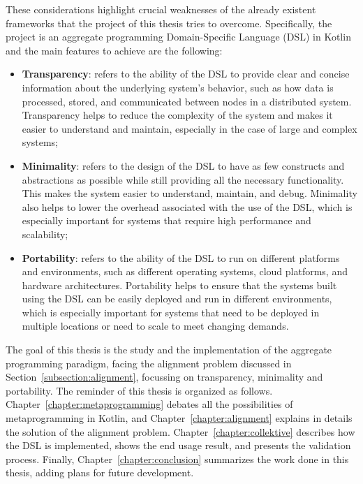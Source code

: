 These considerations highlight crucial weaknesses of the already existent frameworks that the project of this thesis tries to overcome. Specifically, the project is an aggregate programming Domain-Specific Language (DSL) in Kotlin and the main features to achieve are the following:
\begin{itemize}
    \item \textbf{Transparency}: refers to the ability of the DSL to provide clear and concise information about the underlying system's behavior, such as how data is processed, stored, and communicated between nodes in a distributed system. Transparency helps to reduce the complexity of the system and makes it easier to understand and maintain, especially in the case of large and complex systems;
    \item \textbf{Minimality}: refers to the design of the DSL to have as few constructs and abstractions as possible while still providing all the necessary functionality. This makes the system easier to understand, maintain, and debug. Minimality also helps to lower the overhead associated with the use of the DSL, which is especially important for systems that require high performance and scalability;
    \item \textbf{Portability}: refers to the ability of the DSL to run on different platforms and environments, such as different operating systems, cloud platforms, and hardware architectures. Portability helps to ensure that the systems built using the DSL can be easily deployed and run in different environments, which is especially important for systems that need to be deployed in multiple locations or need to scale to meet changing demands.
\end{itemize}

The goal of this thesis is the study and the implementation of the aggregate programming paradigm, facing the alignment problem discussed in Section~\ref{subsection:alignment}, focussing on transparency, minimality and portability.\newline
The reminder of this thesis is organized as follows. Chapter~\ref{chapter:metaprogramming} debates all the possibilities of metaprogramming in Kotlin, and Chapter~\ref{chapter:alignment} explains in details the solution of the alignment problem. Chapter~\ref{chapter:collektive} describes how the DSL is implemented, shows the end usage result, and presents the validation process. Finally, Chapter~\ref{chapter:conclusion} summarizes the work done in this thesis, adding plans for future development.
